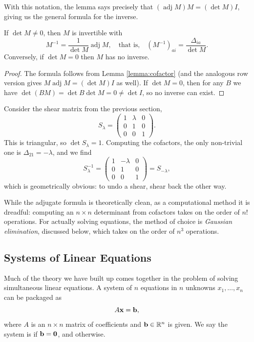 \documentclass[a4paper]{scrartcl}
\newcommand{\adj}{\operatorname{adj}}
\begin{document}
With this notation, the lemma says precisely that $(\adj M) M = (\det M) I$, giving us the general formula for the inverse.

\begin{theorem}
	If $\det M \neq 0$, then $M$ is invertible with
	$$
	M^{-1} = \frac{1}{\det M} \adj M, \quad \text{that is,} \quad (M^{-1})_{ai} = \frac{\Delta_{ia}}{\det M}.
	$$
	Conversely, if $\det M = 0$ then $M$ has no inverse.
\end{theorem}
\begin{proof}
	The formula follows from Lemma \ref{lemma:cofactor} (and the analogous row version gives $M \adj M = (\det M) I$ as well). If $\det M = 0$, then for any $B$ we have $\det(BM) = \det B \det M = 0 \neq \det I$, so no inverse can exist.
\end{proof}

\begin{example}
	Consider the shear matrix from the previous section,
	$$
	S_\lambda = \begin{pmatrix}
		1 & \lambda & 0 \\
		0 & 1 & 0 \\
		0 & 0 & 1
	\end{pmatrix}.
	$$
	This is triangular, so $\det S_\lambda = 1$. Computing the cofactors, the only non-trivial one is $\Delta_{21} = -\lambda$, and we find
	$$
	S_\lambda^{-1} = \begin{pmatrix}
		1 & -\lambda & 0 \\
		0 & 1 & 0 \\
		0 & 0 & 1
	\end{pmatrix} = S_{-\lambda},
	$$
	which is geometrically obvious: to undo a shear, shear back the other way.
\end{example}

While the adjugate formula is theoretically clean, as a computational method it is dreadful: computing an $n \times n$ determinant from cofactors takes on the order of $n!$ operations. For actually solving equations, the method of choice is \emph{Gaussian elimination}, discussed below, which takes on the order of $n^3$ operations.

\subsection{Systems of Linear Equations}

Much of the theory we have built up comes together in the problem of solving simultaneous linear equations. A system of $n$ equations in $n$ unknowns $x_1, \dots, x_n$ can be packaged as
$$
A \mathbf{x} = \mathbf{b},
$$
where $A$ is an $n \times n$ matrix of coefficients and $\mathbf{b} \in \mathbb{R}^n$ is given. We say the system is  if $\mathbf{b} = \mathbf{0}$, and  otherwise.
\end{document}
